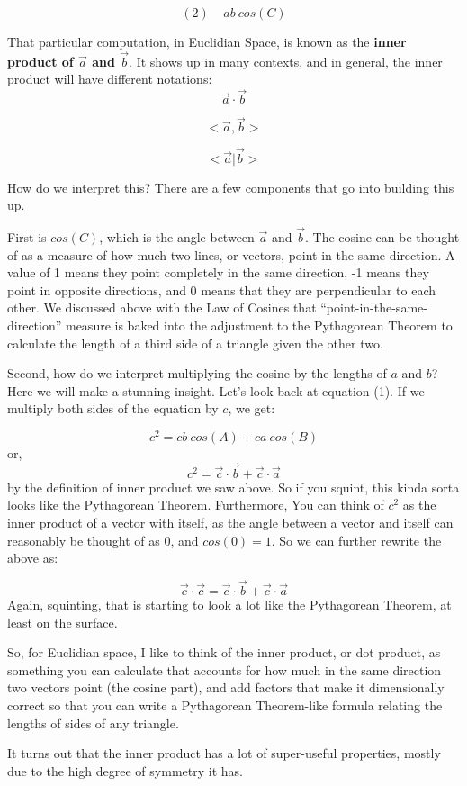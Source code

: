 \documentclass[
]{book}
\begin{document}
\[(2) \ \ \ \ \ a b \ cos(C)\]

That particular computation, in Euclidian Space, is known as the \textbf{inner product of \(\vec{a}\) and \(\vec{b}\)}. It shows up in many contexts, and in general, the inner product will have different notations:
\[\vec{a} \cdot \vec{b}\]

\[ <\vec{a}, \vec{b}>\]

\[ <\vec{a}|\vec{b}>\]

How do we interpret this? There are a few components that go into building this up.

First is \(cos(C)\), which is the angle between \(\vec{a}\) and \(\vec{b}\). The cosine can be thought of as a measure of how much two lines, or vectors, point in the same direction. A value of 1 means they point completely in the same direction, -1 means they point in opposite directions, and 0 means that they are perpendicular to each other. We discussed above with the Law of Cosines that ``point-in-the-same-direction'' measure is baked into the adjustment to the Pythagorean Theorem to calculate the length of a third side of a triangle given the other two.

Second, how do we interpret multiplying the cosine by the lengths of \(a\) and \(b\)? Here we will make a stunning insight. Let's look back at equation (1). If we multiply both sides of the equation by \(c\), we get:

\[c^2 = cb\ cos(A) + ca\ cos(B)\]
or,
\[c^2 = \vec{c}\cdot\vec{b} + \vec{c}\cdot\vec{a}\]
by the definition of inner product we saw above. So if you squint, this kinda sorta looks like the Pythagorean Theorem. Furthermore, You can think of \(c^2\) as the inner product of a vector with itself, as the angle between a vector and itself can reasonably be thought of as 0, and \(cos(0) = 1\). So we can further rewrite the above as:

\[\vec{c}\cdot\vec{c} = \vec{c}\cdot\vec{b} + \vec{c}\cdot\vec{a}\]
Again, squinting, that is starting to look a lot like the Pythagorean Theorem, at least on the surface.

So, for Euclidian space, I like to think of the inner product, or dot product, as something you can calculate that accounts for how much in the same direction two vectors point (the cosine part), and add factors that make it dimensionally correct so that you can write a Pythagorean Theorem-like formula relating the lengths of sides of any triangle.

It turns out that the inner product has a lot of super-useful properties, mostly due to the high degree of symmetry it has.
\end{document}
